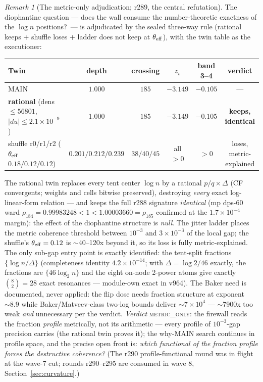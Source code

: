 \documentclass[11pt]{article}
\theoremstyle{definition}
\theoremstyle{remark}
\newtheorem{remark}[theorem]{Remark}
\begin{document}
\begin{remark}[The metric-only adjudication; r289, the central
refutation]\label{rem:metriconly}
The diophantine question --- does the wall consume the number-theoretic
exactness of the $\log n$ positions?\ --- is adjudicated by the sealed
three-way rule (rational keeps $+$ shuffle loses $+$ ladder does not
keep at $\theta_{\rm eff}$), with the twin table as the executioner:
\begin{center}\small
\begin{tabular}{@{}lccccc@{}}
\toprule
\textbf{Twin} & \textbf{depth} & \textbf{crossing} & $z_v$ &
\textbf{band 3--4} & \textbf{verdict}\\
\midrule
MAIN & $1.000$ & $185$ & $-3.149$ & $-0.105$ & ---\\
\textbf{rational} (dens $\le56801$, $|du|\le2.1\times10^{-9}$) &
$1.000$ & $185$ & $-3.149$ & $-0.105$ & \textbf{keeps, identical}\\
shuffle r0/r1/r2 ($\theta_{\rm eff}$ $0.18/0.12/0.12$) &
$0.201/0.212/0.239$ & $38/40/45$ & all $>0$ & $>0$ &
loses, metric-explained\\
\bottomrule
\end{tabular}
\end{center}
The rational twin replaces every tent center $\log n$ by a rational
$p/q\times\Delta$ (CF convergents; weights and cells bitwise
preserved), destroying \emph{every} exact log-linear-form relation ---
and keeps the full r288 signature \emph{identical} (mp dps-60 ward
$\rho_{184}=0.99983248<1<1.00003660=\rho_{185}$ confirmed at the
$1.7\times10^{-4}$ margin): the effect of the diophantine structure is
\emph{null}.  The jitter ladder places the metric coherence threshold
between $10^{-3}$ and $3\times10^{-3}$ of the local gap; the shuffle's
$\theta_{\rm eff}=0.12$ is $\sim$40--120x beyond it, so its loss is
fully metric-explained.  The only sub-gap entry point is exactly
identified: the tent-split fractions $\{\log n/\Delta\}$ (completeness
identity $4.2\times10^{-14}$; with $\Delta=\log2/46$ exactly, the
fractions are $\{46\log_2n\}$ and the eight on-node 2-power atoms give
exactly $\binom82=28$ exact resonances --- module-own exact in v964).
The Baker need is documented, never applied: the flip dose needs
fraction structure at exponent $\sim8.9$ while Baker/Matveev-class
two-log bounds deliver $\sim7\times10^{4}$ --- $\sim$7900x too weak
\emph{and} unnecessary per the verdict.  \emph{Verdict}
\textsc{metric\_only}: the firewall reads the fraction \emph{profile}
metrically, not its arithmetic --- every profile of $10^{-3}$-gap
precision carries (the rational twin proves it); the why-MAIN search
continues in profile space, and the precise open front is: \emph{which
functional of the fraction profile forces the destructive coherence?}
(The r290 profile-functional round was in flight at the wave-7 cut;
rounds r290--r295 are consumed in wave 8,
Section~\ref{sec:curvature}.)
\end{remark}
\end{document}
